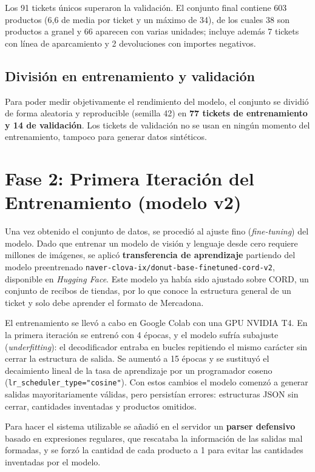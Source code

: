 Los 91 tickets únicos superaron la validación. El conjunto final contiene 603 productos (6,6 de media por ticket y un máximo de 34), de los cuales 38 son productos a granel y 66 aparecen con varias unidades; incluye además 7 tickets con línea de aparcamiento y 2 devoluciones con importes negativos.

\subsection{División en entrenamiento y validación}
Para poder medir objetivamente el rendimiento del modelo, el conjunto se dividió de forma aleatoria y reproducible (semilla 42) en \textbf{77 tickets de entrenamiento y 14 de validación}. Los tickets de validación no se usan en ningún momento del entrenamiento, tampoco para generar datos sintéticos.

\section{Fase 2: Primera Iteración del Entrenamiento (modelo v2)}
Una vez obtenido el conjunto de datos, se procedió al ajuste fino (\textit{fine-tuning}) del modelo. Dado que entrenar un modelo de visión y lenguaje desde cero requiere millones de imágenes, se aplicó \textbf{transferencia de aprendizaje} partiendo del modelo preentrenado \texttt{naver-clova-ix/donut-base-finetuned-cord-v2}, disponible en \textit{Hugging Face}. Este modelo ya había sido ajustado sobre CORD, un conjunto de recibos de tiendas, por lo que conoce la estructura general de un ticket y solo debe aprender el formato de Mercadona.

El entrenamiento se llevó a cabo en Google Colab con una GPU NVIDIA T4. En la primera iteración se entrenó con 4 épocas, y el modelo sufría subajuste (\textit{underfitting}): el decodificador entraba en bucles repitiendo el mismo carácter sin cerrar la estructura de salida. Se aumentó a 15 épocas y se sustituyó el decaimiento lineal de la tasa de aprendizaje por un programador coseno (\texttt{lr\_scheduler\_type="cosine"}). Con estos cambios el modelo comenzó a generar salidas mayoritariamente válidas, pero persistían errores: estructuras JSON sin cerrar, cantidades inventadas y productos omitidos.

Para hacer el sistema utilizable se añadió en el servidor un \textbf{parser defensivo} basado en expresiones regulares, que rescataba la información de las salidas mal formadas, y se forzó la cantidad de cada producto a 1 para evitar las cantidades inventadas por el modelo.

